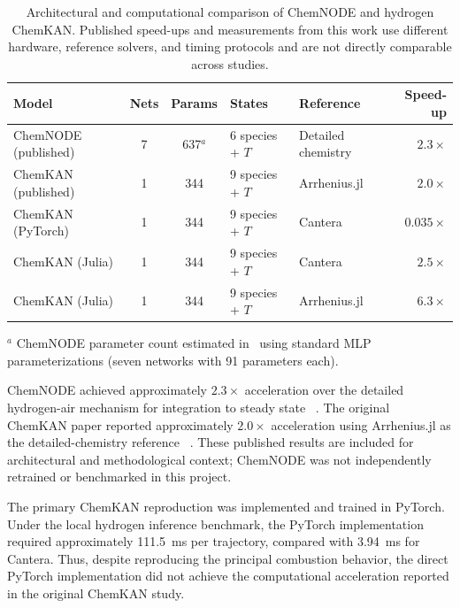 \documentclass[11pt,a4paper]{article}
\begin{document}
\begin{table}[htbp]
\centering
\small
\caption{Architectural and computational
comparison of ChemNODE and hydrogen ChemKAN.
Published speed-ups and measurements from
this work use different hardware, reference
solvers, and timing protocols and are not
directly comparable across studies.}
\label{tab:chemnode_comparison}
\begin{tabularx}{\textwidth}{@{}lccXXr@{}}
\toprule
\textbf{Model} &
\textbf{Nets} &
\textbf{Params} &
\textbf{States} &
\textbf{Reference} &
\textbf{Speed-up} \\
\midrule
ChemNODE (published)
& 7 & 637$^{a}$
& 6 species + $T$
& Detailed chemistry
& $2.3\times$ \\

ChemKAN (published)
& 1 & 344
& 9 species + $T$
& Arrhenius.jl
& $2.0\times$ \\

ChemKAN (PyTorch)
& 1 & 344
& 9 species + $T$
& Cantera
& $0.035\times$ \\

ChemKAN (Julia)
& 1 & 344
& 9 species + $T$
& Cantera
& $2.5\times$ \\

ChemKAN (Julia)
& 1 & 344
& 9 species + $T$
& Arrhenius.jl
& $6.3\times$ \\
\bottomrule
\end{tabularx}

\smallskip
\raggedright\footnotesize
$^{a}$ ChemNODE parameter count estimated
in~\cite{Koenig_2025} using standard MLP
parameterizations (seven networks with
91 parameters each).
\end{table}

ChemNODE achieved approximately $2.3\times$
acceleration over the detailed hydrogen-air
mechanism for integration to steady state
~\cite{OWOYELE2022100118}. The original
ChemKAN paper reported approximately
$2.0\times$ acceleration using Arrhenius.jl
as the detailed-chemistry reference
~\cite{Koenig_2025}. These published
results are included for architectural
and methodological context; ChemNODE was
not independently retrained or benchmarked
in this project.

The primary ChemKAN reproduction was
implemented and trained in PyTorch.
Under the local hydrogen inference
benchmark, the PyTorch implementation
required approximately 111.5~ms per
trajectory, compared with 3.94~ms
for Cantera. Thus, despite reproducing
the principal combustion behavior,
the direct PyTorch implementation
did not achieve the computational
acceleration reported in the original
ChemKAN study.
\end{document}
